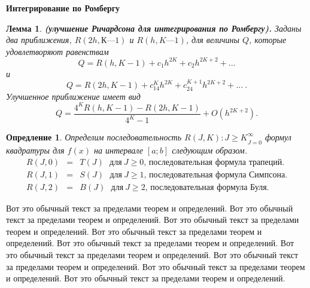 \documentclass[14pt, titlepage, a4paper]{extarticle} %
\newtheorem{definition}{Опредление}
\newtheorem{lemma}{Лемма}
\begin{document}
	\textbf{Интегрирование по Ромбергу}
	
	
	\begin{lemma}
		\textbf{(улучшение Ричардсона для интегрирования по Ромбергу).} Заданы два приближения, $R(2h,К—1)$ и $R(h,K—1)$, для величины $Q$, которые
		удовлетворяют равенствам
		\begin{equation}\label{eq:28}
			Q = R(h,K-1)+c_1h^{2K}+c_2h^{2K+2}+...
		\end{equation}
		и
		\begin{equation}\label{eq:29}
			Q = R(2h,K-1)+c_14^Kh^{2K}+c_24^{K+1}h^{2K+2}+...~.
		\end{equation}
		Улучшенное приближение имеет вид
		\begin{equation}\label{eq:30}
			Q = \frac{4^KR(h,K-1)-R(2h,K-1)}{4^K-1}+O(h^{2K+2}).
		\end{equation}
	\end{lemma}


	\begin{definition}\label{df:7.4}
		Определим последовательность ${R(J,K):J\ge K}^{\infty}_{J=0}$ формул квадратуры для $f(x)$ на интервале $[a;b]$ следующим образом.
		\begin{eqnarray}
			\nonumber
			R(J,0) &=& T(J)~~~\text{для}~J\ge 0\text{, последовательная формула трапеций.}\\
			\nonumber
			R(J,1) &=& S(J)~~~\text{для}~J\ge 1\text{, последовательная формула Симпсона.}\\
			\label{eq:31}
			R(J,2) &=& B(J)~~~\text{для}~J\ge 2\text{, последовательная формула Буля.}
		\end{eqnarray}
	\end{definition}


	Вот это обычный текст за пределами теорем и определений. Вот это обычный текст за пределами теорем и определений. Вот это обычный текст за пределами теорем и определений. Вот это обычный текст за пределами теорем и определений. Вот это обычный текст за пределами теорем и определений. Вот это обычный текст за пределами теорем и определений. Вот это обычный текст за пределами теорем и определений. Вот это обычный текст за пределами теорем и определений. Вот это обычный текст за пределами теорем и определений. 
	
\end{document}
